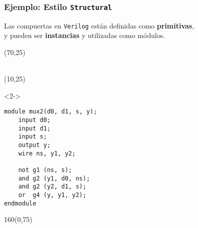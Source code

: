 \documentclass[aspectratio=169]{beamer}
\begin{document}
\begin{frame}[fragile,t]
    \frametitle{Ejemplo: Estilo \texttt{Structural}}
    Las compuertas en \texttt{Verilog} están definidas como \textbf{\textcolor{naranjauca}{primitivas}},\\
    y pueden ser \textbf{\textcolor{naranjauca}{instancias}} y utilizadas como módulos.
    \begin{textblock}{80}(70,25)
    \\
    \bigskip
    \\
    \begin{center}
    \end{center}
    \end{textblock}
    \begin{textblock}{55}(10,25)
    \begin{onlyenv}<2->
\begin{lstlisting}
module mux2(d0, d1, s, y);
    input d0;
    input d1;
    input s;
    output y;
    wire ns, y1, y2;

    not g1 (ns, s);
    and g2 (y1, d0, ns);
    and g2 (y2, d1, s);
    or  g4 (y, y1, y2);
endmodule
\end{lstlisting}
    \end{onlyenv}
    \end{textblock}
    \begin{textblock}{160}(0,75)
    \begin{center}
    \end{center}
    \end{textblock}
\end{frame}
\end{document}
